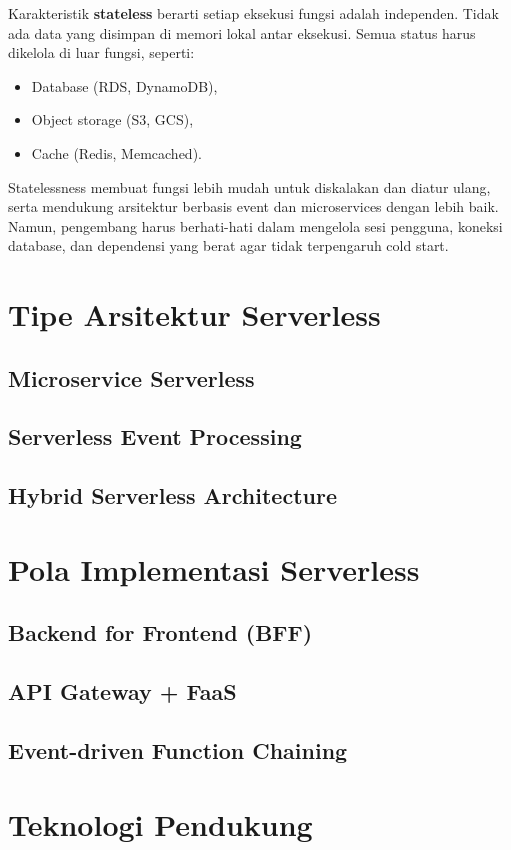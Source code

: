 Karakteristik \textbf{stateless} berarti setiap eksekusi fungsi adalah independen. Tidak ada data yang disimpan di memori lokal antar eksekusi. Semua status harus dikelola di luar fungsi, seperti:
\begin{itemize}
	\item Database (RDS, DynamoDB),
	\item Object storage (S3, GCS),
	\item Cache (Redis, Memcached).
\end{itemize}

Statelessness membuat fungsi lebih mudah untuk diskalakan dan diatur ulang, serta mendukung arsitektur berbasis event dan microservices dengan lebih baik. Namun, pengembang harus berhati-hati dalam mengelola sesi pengguna, koneksi database, dan dependensi yang berat agar tidak terpengaruh cold start.


\section{Tipe Arsitektur Serverless}
\subsection{Microservice Serverless}
\subsection{Serverless Event Processing}
\subsection{Hybrid Serverless Architecture}

\section{Pola Implementasi Serverless}
\subsection{Backend for Frontend (BFF)}
\subsection{API Gateway + FaaS}
\subsection{Event-driven Function Chaining}

\section{Teknologi Pendukung}
